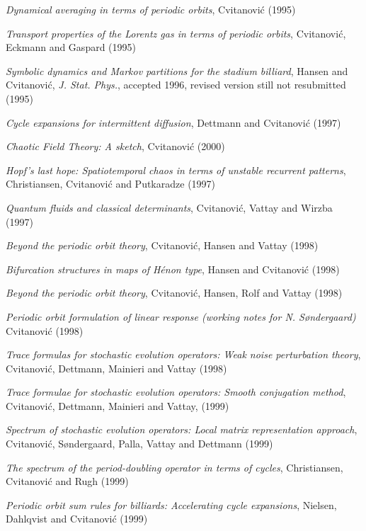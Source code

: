 {{
{\em Dynamical averaging in terms of periodic orbits},
{Cvitanovi{\'c}}
{(1995)}

{\em Transport properties of the {Lorentz} gas in terms of periodic orbits},
{Cvitanovi{\'c}, Eckmann and Gaspard}
{(1995)}

{\em Symbolic dynamics and {Markov} partitions for the stadium billiard},
{Hansen and Cvitanovi{\'c}},
{{\em J. Stat. Phys.}, accepted 1996, revised version still not resubmitted}
{(1995)}

{\em Cycle expansions for intermittent diffusion},
 {Dettmann and Cvitanovi{\'c}}
{(1997)}

{\em {Chaotic Field Theory}: {A} sketch},
{Cvitanovi{\'c}}
{(2000)}

{\em Hopf's last hope: {Spatiotemporal} chaos in terms of unstable
recurrent patterns},
{Christiansen, Cvitanovi{\'c} and Putkaradze}
{(1997)}

{\em Quantum fluids and classical determinants},
{Cvitanovi{\'c}, Vattay and Wirzba}
{(1997)}

{\em Beyond the periodic orbit theory},
{Cvitanovi{\'c}, Hansen and Vattay}
{(1998)}

{\em Bifurcation structures in maps of {H\'enon} type},
{Hansen and Cvitanovi{\'c}}
{(1998)}

{\em Beyond the periodic orbit theory},
{Cvitanovi{\'c}, Hansen, Rolf  and Vattay}
{(1998)}

{\em Periodic orbit formulation of linear response (working notes for {N.
S{\o}ndergaard})}
{Cvitanovi{\'c}}
{(1998)}

 {\em Trace formulas for stochastic evolution operators:
{Weak} noise perturbation theory},
{Cvitanovi{\'c}, Dettmann, Mainieri and Vattay}
{(1998)}

{\em Trace formulae for stochastic evolution operators: {Smooth}
conjugation method},
{Cvitanovi{\'c}, Dettmann, Mainieri and Vattay},
{(1999)}

{\em Spectrum of stochastic evolution operators: {Local} matrix
representation approach},
{Cvitanovi{\'c}, S{\o}ndergaard, Palla, Vattay and Dettmann}
{(1999)}

{\em The spectrum of the period-doubling operator in terms of cycles},
{Christiansen, Cvitanovi{\'c} and Rugh}
{(1999)}

{\em Periodic orbit sum rules for billiards: {Accelerating} cycle expansions},
{Nielsen,  Dahlqvist and Cvitanovi{\'c}}
{(1999)}

}}
